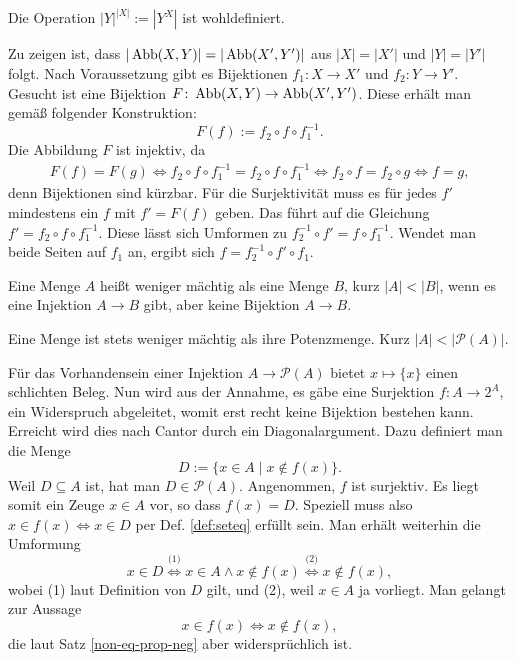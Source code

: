\newpage
\begin{Satz}\newlinefirst
Die Operation $|Y|^{|X|}:=|Y^X|$ ist wohldefiniert.
\end{Satz}
\begin{Beweis}
Zu zeigen ist, dass $|\operatorname{Abb}(X,Y)|=|\operatorname{Abb}(X',Y')|$
aus $|X|=|X'|$ und $|Y|=|Y'|$ folgt. Nach Voraussetzung gibt
es Bijektionen $f_1\colon X\to X'$ und $f_2\colon Y\to Y'$.
Gesucht ist eine Bijektion $F\colon\operatorname{Abb}(X,Y)\to\operatorname{Abb}(X',Y')$.
Diese erhält man gemäß folgender Konstruktion:
\[F(f) := f_2\circ f\circ f_1^{-1}.\]
Die Abbildung $F$ ist injektiv, da
\begin{gather*}
F(f)=F(g) \iff f_2\circ f\circ f_1^{-1} = f_2\circ f\circ f_1^{-1}
\iff f_2\circ f = f_2\circ g\iff f=g,
\end{gather*}
denn Bijektionen sind kürzbar. Für die Surjektivität muss
es für jedes $f'$ mindestens ein $f$ mit $f'=F(f)$ geben.
Das führt auf die Gleichung $f'=f_2\circ f\circ f_1^{-1}$.
Diese lässt sich Umformen zu $f_2^{-1}\circ f'=f\circ f_1^{-1}$.
Wendet man beide Seiten auf $f_1$ an, ergibt sich
$f=f_2^{-1}\circ f'\circ f_1$.\;\qedsymbol
\end{Beweis}

\begin{Definition}\newlinefirst
Eine Menge $A$ heißt weniger mächtig als eine Menge $B$, kurz
$|A|<|B|$, wenn es eine Injektion $A\to B$ gibt, aber keine
Bijektion $A\to B$.
\end{Definition}

\begin{Satz}\newlinefirst
Eine Menge ist stets weniger mächtig als ihre Potenzmenge.
Kurz $|A|<|\mathcal P(A)|$. 
\end{Satz}

\begin{Beweis}
Für das Vorhandensein einer Injektion $A\to\mathcal P(A)$ bietet $x\mapsto\{x\}$
einen schlichten Beleg. Nun wird aus der Annahme, es gäbe eine Surjektion
$f\colon A\to 2^A$, ein Widerspruch abgeleitet, womit erst recht
keine Bijektion bestehen kann. Erreicht wird dies nach Cantor durch ein
Diagonalargument. Dazu definiert man die Menge
\[D := \{x\in A\mid x\notin f(x)\}.\]
Weil $D\subseteq A$ ist, hat man $D\in\mathcal P(A)$. Angenommen, $f$ ist surjektiv.
Es liegt somit ein Zeuge $x\in A$ vor, so dass $f(x) = D$. Speziell muss also
$x\in f(x) \Leftrightarrow x\in D$
per Def. \ref{def:seteq} erfüllt sein. Man erhält weiterhin die Umformung
\[x\in D \stackrel{\text{(1)}}\iff x\in A\land x\notin f(x)
\stackrel{\text{(2)}}\iff x\notin f(x),\]
wobei (1) laut Definition von $D$ gilt, und (2), weil $x\in A$
ja vorliegt. Man gelangt zur Aussage
\[x\in f(x) \iff x\notin f(x),\]
die laut Satz \ref{non-eq-prop-neg} aber widersprüchlich ist.\,\qedsymbol
\end{Beweis}


